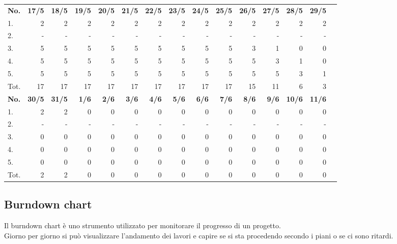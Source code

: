 \documentclass{article}
\begin{document}
\begin{table}[H]
    \centering
    \begin{tabularx}{\textwidth}{| X | r | r | r | r | r | r | r | r | r | r | r | r | r | r |}
        \Xhline{2pt}
        \textbf{No.} & \textbf{17/5} & \textbf{18/5} & \textbf{19/5} & \textbf{20/5} & \textbf{21/5} & \textbf{22/5} & \textbf{23/5} & \textbf{24/5} & \textbf{25/5} & \textbf{26/5} & \textbf{27/5} & \textbf{28/5} & \textbf{29/5} \\
        \Xhline{2pt}
        1. & 2 & 2 & 2 & 2 & 2 & 2 & 2 & 2 & 2 & 2 & 2 & 2 & 2 \\
        \hline
        2. & - & - & - & - & - & - & - & - & - & - & - & - & - \\
        \hline
        3. & 5 & 5 & 5 & 5 & 5 & 5 & 5 & 5 & 5 & 3 & 1 & 0 & 0 \\
        \hline
        4. & 5 & 5 & 5 & 5 & 5 & 5 & 5 & 5 & 5 & 5 & 3 & 1 & 0 \\
        \hline
        5. & 5 & 5 & 5 & 5 & 5 & 5 & 5 & 5 & 5 & 5 & 5 & 3 & 1 \\
        \hline
        Tot. & 17 & 17 & 17 & 17 & 17 & 17 & 17 & 17 & 17 & 15 & 11 & 6 & 3 \\
        \Xhline{2pt}
        \textbf{No.} & \textbf{30/5} & \textbf{31/5} & \textbf{ 1/6} & \textbf{ 2/6} & \textbf{ 3/6} & \textbf{ 4/6} & \textbf{ 5/6} & \textbf{ 6/6} & \textbf{ 7/6} & \textbf{ 8/6} & \textbf{ 9/6} & \textbf{10/6} & \textbf{11/6} \\
        \Xhline{2pt}
        1. & 2 & 2 & 0 & 0 & 0 & 0 & 0 & 0 & 0 & 0 & 0 & 0 & 0 \\
        \hline
        2. & - & - & - & - & - & - & - & - & - & - & - & - & - \\
        \hline
        3. & 0 & 0 & 0 & 0 & 0 & 0 & 0 & 0 & 0 & 0 & 0 & 0 & 0 \\
        \hline
        4. & 0 & 0 & 0 & 0 & 0 & 0 & 0 & 0 & 0 & 0 & 0 & 0 & 0 \\
        \hline
        5. & 0 & 0 & 0 & 0 & 0 & 0 & 0 & 0 & 0 & 0 & 0 & 0 & 0 \\
        \hline
        Tot. & 2 & 2 & 0 & 0 & 0 & 0 & 0 & 0 & 0 & 0 & 0 & 0 & 0 \\
        \hline
    \end{tabularx}
\end{table}

\clearpage

\subsection{Burndown chart}
Il burndown chart è uno strumento utilizzato per monitorare il progresso di un progetto.\\
Giorno per giorno si può visualizzare l'andamento dei lavori e capire se si sta procedendo secondo i piani o se ci sono ritardi.\\
\end{document}
